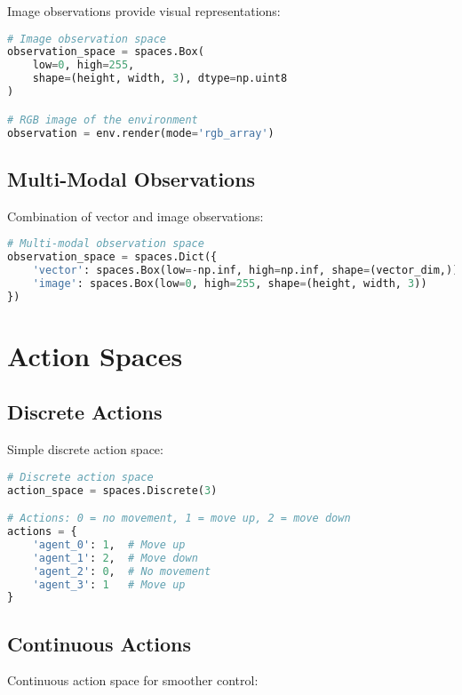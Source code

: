 Image observations provide visual representations:

\begin{lstlisting}[language=python, caption=Image Observations]
# Image observation space
observation_space = spaces.Box(
    low=0, high=255, 
    shape=(height, width, 3), dtype=np.uint8
)

# RGB image of the environment
observation = env.render(mode='rgb_array')
\end{lstlisting}

\subsection{Multi-Modal Observations}

Combination of vector and image observations:

\begin{lstlisting}[language=python, caption=Multi-Modal Observations]
# Multi-modal observation space
observation_space = spaces.Dict({
    'vector': spaces.Box(low=-np.inf, high=np.inf, shape=(vector_dim,)),
    'image': spaces.Box(low=0, high=255, shape=(height, width, 3))
})
\end{lstlisting}

\section{Action Spaces}

\subsection{Discrete Actions}

Simple discrete action space:

\begin{lstlisting}[language=python, caption=Discrete Actions]
# Discrete action space
action_space = spaces.Discrete(3)

# Actions: 0 = no movement, 1 = move up, 2 = move down
actions = {
    'agent_0': 1,  # Move up
    'agent_1': 2,  # Move down
    'agent_2': 0,  # No movement
    'agent_3': 1   # Move up
}
\end{lstlisting}

\subsection{Continuous Actions}

Continuous action space for smoother control:

